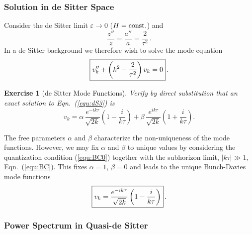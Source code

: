\documentclass[12pt,letterpaper,rotate]{article}
\def\beq{\begin{equation}}
\def\eeq{\end{equation}}
\newtheorem{thm}{Exercise}
\begin{document}
{\subsubsection{Solution in de Sitter Space}
\label{sec:dSmode}

Consider the de Sitter limit $\varepsilon \to 0$ ($H = {\rm const.}$) and
\beq
\frac{z''}{z} = \frac{a''}{a} =\frac{2}{\tau^2}\, .
\eeq
In a de Sitter background we therefore wish to solve the mode equation
\beq
\label{equ:dS3}
\fbox{$\displaystyle
v_k'' + \left( k^2 - \frac{2}{\tau^2}\right) v_k =0 $}\, .
\eeq

\begin{thm}[de Sitter Mode Functions]
Verify by direct substitution that an exact solution to Eqn.~(\ref{equ:dS3}) is
\beq
v_k = \alpha \, \frac{e^{-ik \tau}}{\sqrt{2k}} \left(1- \frac{i}{k\tau} \right) + \beta\, \frac{e^{ik \tau}}{\sqrt{2k}} \left(1+ \frac{i}{k\tau} \right).
\eeq
\end{thm}

The free parameters $\alpha$ and $\beta$ characterize the non-uniqueness of the mode functions. However, we may fix $\alpha$ and $\beta$ to unique values by considering the quantization condition (\ref{equ:BC0}) together with the subhorizon limit, $| k \tau| \gg 1$, Eqn.~(\ref{equ:BC}).
This fixes $\alpha=1$, $\beta=0$ and leads to the unique Bunch-Davies mode functions 
\begin{equation}
\fbox{$\displaystyle
v_{k} = \frac{e^{-i k \tau}}{\sqrt{2k}} \left(1-\frac{i}{k \tau} \right) $}\, .
\end{equation}




\subsubsection{Power Spectrum in Quasi-de Sitter}

}
\end{document}
